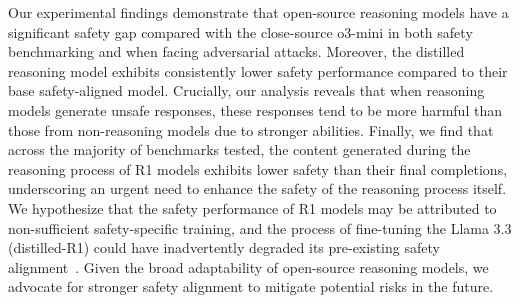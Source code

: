 Our experimental findings demonstrate that open-source reasoning models have a significant safety gap compared with the close-source o3-mini in both safety benchmarking and when facing adversarial attacks. Moreover, the distilled reasoning model exhibits consistently lower safety performance compared to their base safety-aligned model. 
Crucially, our analysis reveals that when reasoning models generate unsafe responses, these responses tend to be more harmful than those from non-reasoning models due to stronger abilities.
Finally, we find that across the majority of benchmarks tested, the content generated during the reasoning process of R1 models exhibits lower safety than their final completions, underscoring an urgent need to enhance the safety of the reasoning process itself.  
We hypothesize that the safety performance of R1 models may be attributed to non-sufficient safety-specific training, and the process of fine-tuning the Llama 3.3 (distilled-R1) could have inadvertently degraded its pre-existing safety alignment~\citep{qi2023fine}. 
Given the broad adaptability of open-source reasoning models, we advocate for stronger safety alignment to mitigate potential risks in the future.


